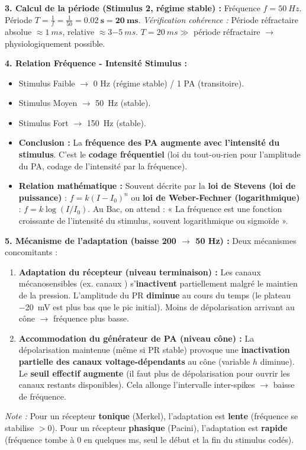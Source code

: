 \documentclass[11pt]{article}
\begin{document}
\begin{exoresolu}
\textbf{3. Calcul de la période (Stimulus 2, régime stable) :}
Fréquence $f = \SI{50}{Hz}$.
Période $T = \frac{1}{f} = \frac{1}{50} = \mathbf{0.02\ s = 20\ ms}$.
\textit{Vérification cohérence :} Période réfractaire absolue $\approx \SI{1}{ms}$, relative $\approx \SI{3-5}{ms}$. $T = \SI{20}{ms} \gg$ période réfractaire $\rightarrow$ physiologiquement possible.

\textbf{4. Relation Fréquence - Intensité Stimulus :}
\begin{itemize}
    \item Stimulus Faible $\rightarrow$ 0 Hz (régime stable) / 1 PA (transitoire).
    \item Stimulus Moyen $\rightarrow$ \SI{50}{Hz} (stable).
    \item Stimulus Fort $\rightarrow$ \SI{150}{Hz} (stable).
    \item \textbf{Conclusion :} La \textbf{fréquence des PA augmente avec l'intensité du stimulus}. C'est le \textbf{codage fréquentiel} (loi du tout-ou-rien pour l'amplitude du PA, codage de l'intensité par la fréquence).
    \item \textbf{Relation mathématique :} Souvent décrite par la \textbf{loi de Stevens (loi de puissance)} : $f = k (I - I_0)^n$ ou \textbf{loi de Weber-Fechner (logarithmique)} : $f = k \log(I/I_0)$. Au Bac, on attend : « La fréquence est une fonction croissante de l'intensité du stimulus, souvent logarithmique ou sigmoïde ».
\end{itemize}

\textbf{5. Mécanisme de l'adaptation (baisse 200 $\to$ 50 Hz) :}
Deux mécanismes concomitants :
\begin{enumerate}
    \item \textbf{Adaptation du récepteur (niveau terminaison) :} Les canaux mécanosensibles (ex. canaux ) s'\textbf{inactivent} partiellement malgré le maintien de la pression. L'amplitude du PR \textbf{diminue} au cours du temps (le plateau \SI{-20}{mV} est plus bas que le pic initial). Moins de dépolarisation arrivant au cône $\rightarrow$ fréquence plus basse.
    \item \textbf{Accommodation du générateur de PA (niveau cône) :} La dépolarisation maintenue (même si PR stable) provoque une \textbf{inactivation partielle des canaux  voltage-dépendants} au cône (variable $h$ diminue). Le \textbf{seuil effectif augmente} (il faut plus de dépolarisation pour ouvrir les canaux  restants disponibles). Cela allonge l'intervalle inter-spikes $\rightarrow$ baisse de fréquence.
\end{enumerate}
\textit{Note :} Pour un récepteur \textbf{tonique} (Merkel), l'adaptation est \textbf{lente} (fréquence se stabilise $> 0$). Pour un récepteur \textbf{phasique} (Pacini), l'adaptation est \textbf{rapide} (fréquence tombe à 0 en quelques ms, seul le début et la fin du stimulus codés).


\end{exoresolu}
\end{document}
